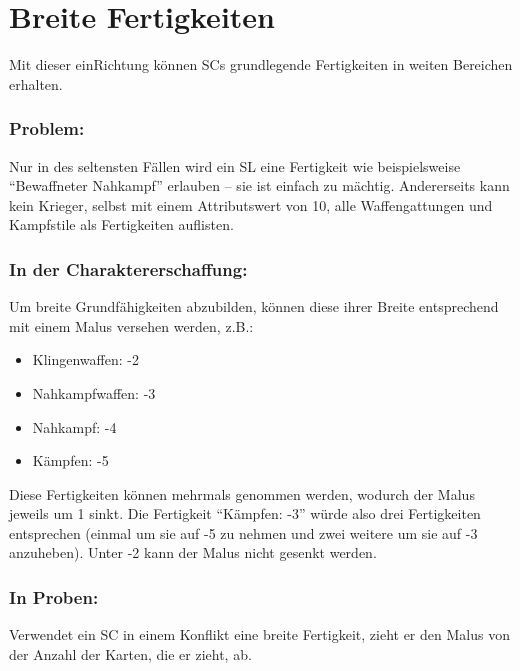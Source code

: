 \section{Breite Fertigkeiten}
Mit dieser einRichtung können SCs grundlegende Fertigkeiten in weiten Bereichen erhalten.
\subsubsection{Problem:}
Nur in des seltensten Fällen wird ein SL eine Fertigkeit wie beispielsweise "`Bewaffneter Nahkampf"' erlauben -- sie ist einfach zu mächtig. Andererseits kann kein Krieger, selbst mit einem Attributswert von 10, alle Waffengattungen und Kampfstile als Fertigkeiten auflisten.

\subsubsection{In der Charaktererschaffung:}
Um breite Grundfähigkeiten abzubilden, können diese ihrer Breite entsprechend mit einem Malus versehen werden, z.B.:
\begin{itemize}
\item Klingenwaffen: -2
\item Nahkampfwaffen: -3
\item Nahkampf: -4
\item Kämpfen: -5
\end{itemize}
Diese Fertigkeiten können mehrmals genommen werden, wodurch der Malus jeweils um 1 sinkt. Die Fertigkeit "`Kämpfen: -3"' würde also drei Fertigkeiten entsprechen (einmal um sie auf -5 zu nehmen und zwei weitere um sie auf -3 anzuheben). Unter -2 kann der Malus nicht gesenkt werden.

\subsubsection{In Proben:}
Verwendet ein SC in einem Konflikt eine breite Fertigkeit, zieht er den Malus von der Anzahl der Karten, die er zieht, ab.


